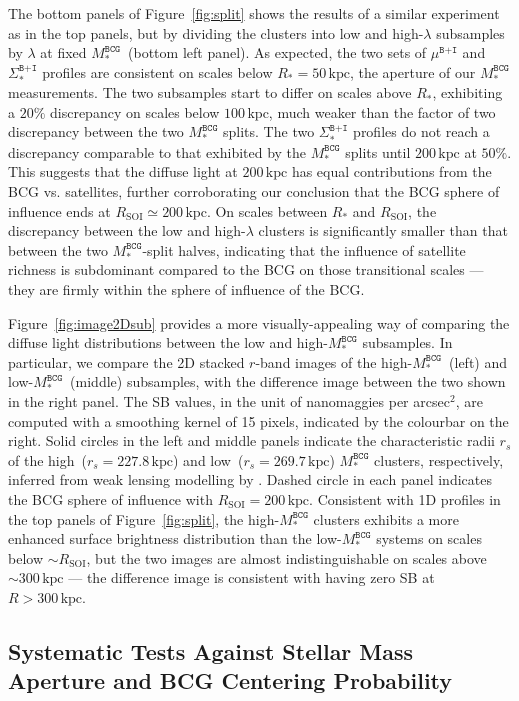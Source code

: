 \documentclass[fleqn,usenatbib]{mnras}
\newcommand{\rsoi}{R_{\mathrm{SOI}}}
\newcommand{\sigbi}{\Sigma_*^{\texttt{B+I}}}
\newcommand{\mubi}{\mu^{\texttt{B+I}}}
\newcommand{\msbcg}{M_*^{\texttt{BCG}}}
\newcommand{\kpc}{\mathrm{kpc}}
\begin{document}
The bottom panels of Figure~\ref{fig:split} shows the results of a similar
experiment as in the top panels, but by dividing the clusters into low and
high-$\lambda$ subsamples by $\lambda$ at fixed $\msbcg$~(bottom left
panel). As expected, the two sets of $\mubi$ and $\sigbi$ profiles are
consistent on scales below $R_*{=}50\,\kpc$, the aperture of our $\msbcg$
measurements. The two subsamples start to differ on scales
above $R_*$, exhibiting a $20\%$ discrepancy on scales below $100\,\kpc$,
much weaker than the factor of two discrepancy between the two $\msbcg$
splits.  The two $\sigbi$ profiles do not reach a discrepancy comparable to
that exhibited by the $\msbcg$ splits until
$200\,\kpc$ at $50\%$.  This suggests that the diffuse light at
$200\,\kpc$ has equal contributions from the BCG vs. satellites,
further corroborating our conclusion that the BCG sphere of influence ends
at $\rsoi{\simeq}200\,\kpc$.  On scales between $R_*$ and $\rsoi$, the
discrepancy between the low and high-$\lambda$ clusters is significantly
smaller than that between the two $\msbcg$-split halves, indicating that
the influence of satellite richness is subdominant compared to the BCG on
those transitional scales --- they are firmly within the sphere of
influence of the BCG.


Figure~\ref{fig:image2Dsub} provides a more visually-appealing way of
comparing the diffuse light distributions between the low and high-$\msbcg$
subsamples. In particular, we compare the 2D stacked $r$-band images of the
high-$\msbcg$~(left) and low-$\msbcg$~(middle) subsamples, with the
difference image between the two shown in the right panel. The SB values,
in the unit of nanomaggies per arcsec$^{2}$, are computed with a smoothing
kernel of 15 pixels, indicated by the colourbar on the right. Solid circles
in the left and middle panels indicate the characteristic radii $r_s$ of
the high~($r_{s}{=}227.8\,\kpc$) and low~($r_{s}{=}269.7\,\kpc$) $\msbcg$
clusters, respectively, inferred from weak lensing modelling by
.  Dashed circle in each panel indicates the BCG sphere
of influence with $\rsoi{=}200\,\kpc$.  Consistent with 1D profiles in the
top panels of Figure~\ref{fig:split}, the high-$\msbcg$ clusters exhibits a
more enhanced surface brightness distribution than the low-$\msbcg$ systems
on scales below ${\sim}\rsoi$, but the two images are almost
indistinguishable on scales above ${\sim}300\,\kpc$ --- the difference
image is consistent with having zero SB at $R{>}300\,\kpc$.


\subsection{Systematic Tests Against Stellar Mass Aperture and BCG
Centering Probability}
\label{subsec:test}
\end{document}
